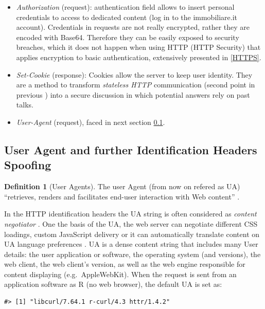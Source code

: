\documentclass[
  12pt,
  a4paper,
  oneside]{book}
\providecommand{\tightlist}{%
  \setlength{\itemsep}{0pt}\setlength{\parskip}{0pt}}
\theoremstyle{definition}
\newtheorem{definition}{Definition}[chapter]
\theoremstyle{definition}
\theoremstyle{definition}
\theoremstyle{remark}
\begin{document}
\begin{itemize}
\tightlist
\item
  \emph{Authorization} (request): authentication field allows to insert personal credentials to access to dedicated content (log in to the immobiliare.it account). Credentials in requests are not really encrypted, rather they are encoded with Base64. Therefore they can be easily exposed to security breaches, which it does not happen when using HTTP (HTTP Security) that applies encryption to basic authentication, extensively presented in \ref{HTTPS}.
\item
  \emph{Set-Cookie} (response): Cookies allow the server to keep user identity. They are a method to transform \emph{stateless HTTP} communication (second point in previous ) into a secure discussion in which potential answers rely on past talks.
\item
  \emph{User-Agent} (request), faced in next section \ref{spoofing}.
\end{itemize}

\hypertarget{spoofing}{%
\subsection{User Agent and further Identification Headers Spoofing}\label{spoofing}}

\begin{definition}[User Agents]
\protect\hypertarget{def:useragents}{}{\label{def:useragents} {} }The user Agent (from now on refered as UA) ``retrieves, renders and facilitates end-user interaction with Web content'' \citep{UaDef}.
\end{definition}

In the HTTP identification headers the UA string is often considered as \emph{content negotiator} \citep{wiki:UserAgent}. One the basis of the UA, the web server can negotiate different CSS loadings, custom JavaScript delivery or it can automatically translate content on UA language preferences \citep{whoishostingthis.com}.
UA is a dense content string that includes many User details: the user application or software, the operating system (and versions), the web client, the web client's version, as well as the web engine responsible for content displaying (e.g.~AppleWebKit). When the request is sent from an application software as R (no web browser), the default UA is set as:

\begin{lstlisting}
#> [1] "libcurl/7.64.1 r-curl/4.3 httr/1.4.2"
\end{lstlisting}
\end{document}
